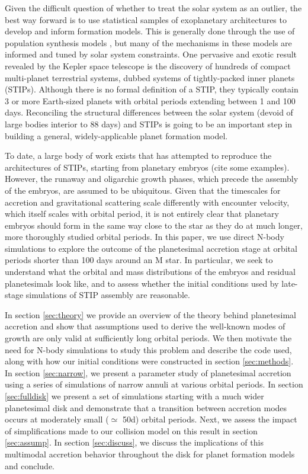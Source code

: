 \documentclass[twocolumn]{aastex63}
\begin{document}
Given the difficult question of whether to treat the solar system as
an outlier, the best way forward is to use statistical samples of
exoplanetary architectures to develop and inform formation
models. This is generally done through the use of population synthesis
models \citep{ida04, alibert11}, but many of the mechanisms in these
models are informed and tuned by solar system constraints. One
pervasive and exotic result revealed by the Kepler space telescope is the discovery of hundreds of compact multi-planet terrestrial systems, dubbed systems of tightly-packed inner planets (STIPs). Although there is no formal definition of a STIP, they typically contain 3 or more Earth-sized planets with orbital periods extending between 1 and 100 days. Reconciling the structural differences between the solar system (devoid of large bodies interior to 88 days) and STIPs is going to be an important step in building a general, widely-applicable planet formation model.

To date, a large body of work exists that has attempted to reproduce
the architectures of STIPs, starting from planetary embryos (cite some
examples). However, the runaway and oligarchic growth phases, which
precede the assembly of the embryos, are assumed to be
ubiquitous. Given that the timescales for accretion and gravitational
scattering scale differently with encounter velocity, which itself
scales with orbital period, it is not entirely clear that planetary
embryos should form in the same way close to the star as they do at
much longer, more thoroughly studied orbital periods. In this paper,
we use direct N-body simulations to explore the outcome of the
planetesimal accretion stage at orbital periods shorter than 100 days
around an M star.
In particular, we seek to understand what the orbital and mass distributions of the embryos and residual planetesimals look like, and to assess whether the initial conditions used by late-stage simulations of STIP assembly are reasonable.

In section \ref{sec:theory} we provide an overview of the theory
behind planetesimal accretion and show that assumptions used to derive
the well-known modes of growth are only valid at sufficiently long
orbital periods. We then motivate the need for N-body simulations to
study this problem and describe the code used, along with how our
initial conditions were constructed in section \ref{sec:methods}. In
section \ref{sec:narrow}, we present a parameter study of planetesimal
accretion using a series of simulations of narrow annuli at various
orbital periods. In section \ref{sec:fulldisk} we present a set of simulations starting with a much wider planetesimal disk and demonstrate that a transition between accretion modes occurs at moderately small ($\simeq$ 50d) orbital periods. Next, we assess the impact of simplifications made to our collision model on this result in section \ref{sec:assump}. In section \ref{sec:discuss}, we discuss the implications of this multimodal accretion behavior throughout the disk for planet formation models and conclude.
\end{document}
